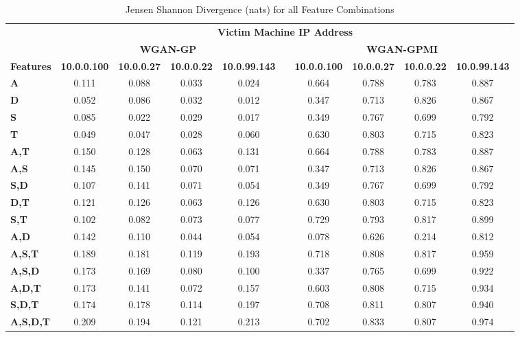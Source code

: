 \begin{table}[!htbp]
	\caption{Jensen Shannon Divergence (nats) for all Feature Combinations}
	\label{tab:jsd}
	\centering
	\begin{adjustbox}{angle=90}
		\begin{tabular}{l|c|c|c|c|c|c|c|c|c|}
			\multicolumn{1}{c|}{} & \multicolumn{9}{c|}{\textbf{Victim Machine IP Address}} \\
			\multicolumn{1}{c|}{} & \multicolumn{4}{c|}{\textbf{WGAN-GP}} &  & \multicolumn{4}{c|}{\textbf{WGAN-GPMI}} \\
			\multicolumn{1}{c|}{\textbf{Features}} & \textbf{10.0.0.100} & \textbf{10.0.0.27} & \textbf{10.0.0.22} & \textbf{10.0.99.143} & \textbf{} & \textbf{10.0.0.100} & \textbf{10.0.0.27} & \textbf{10.0.0.22} & \textbf{10.0.99.143} \\ \hline
			\textbf{A} & 0.111 & 0.088 & 0.033 & 0.024 &  & 0.664 & 0.788 & 0.783 & 0.887 \\
			\textbf{D} & 0.052 & 0.086 & 0.032 & 0.012 &  & 0.347 & 0.713 & 0.826 & 0.867 \\
			\textbf{S} & 0.085 & 0.022 & 0.029 & 0.017 &  & 0.349 & 0.767 & 0.699 & 0.792 \\
			\textbf{T} & 0.049 & 0.047 & 0.028 & 0.060 &  & 0.630 & 0.803 & 0.715 & 0.823 \\ \hline
			\textbf{A,T} & 0.150 & 0.128 & 0.063 & 0.131 &  & 0.664 & 0.788 & 0.783 & 0.887 \\
			\textbf{A,S} & 0.145 & 0.150 & 0.070 & 0.071 &  & 0.347 & 0.713 & 0.826 & 0.867 \\
			\textbf{S,D} & 0.107 & 0.141 & 0.071 & 0.054 &  & 0.349 & 0.767 & 0.699 & 0.792 \\
			\textbf{D,T} & 0.121 & 0.126 & 0.063 & 0.126 &  & 0.630 & 0.803 & 0.715 & 0.823 \\
			\textbf{S,T} & 0.102 & 0.082 & 0.073 & 0.077 &  & 0.729 & 0.793 & 0.817 & 0.899 \\
			\textbf{A,D} & 0.142 & 0.110 & 0.044 & 0.054 &  & 0.078 & 0.626 & 0.214 & 0.812 \\ \hline
			\textbf{A,S,T} & 0.189 & 0.181 & 0.119 & 0.193 &  & 0.718 & 0.808 & 0.817 & 0.959 \\
			\textbf{A,S,D} & 0.173 & 0.169 & 0.080 & 0.100 &  & 0.337 & 0.765 & 0.699 & 0.922 \\
			\textbf{A,D,T} & 0.173 & 0.141 & 0.072 & 0.157 &  & 0.603 & 0.808 & 0.715 & 0.934 \\
			\textbf{S,D,T} & 0.174 & 0.178 & 0.114 & 0.197 &  & 0.708 & 0.811 & 0.807 & 0.940 \\ \hline
			\textbf{A,S,D,T} & 0.209 & 0.194 & 0.121 & 0.213 &  & 0.702 & 0.833 & 0.807 & 0.974 \\
		\end{tabular}
	\end{adjustbox}
\end{table}


